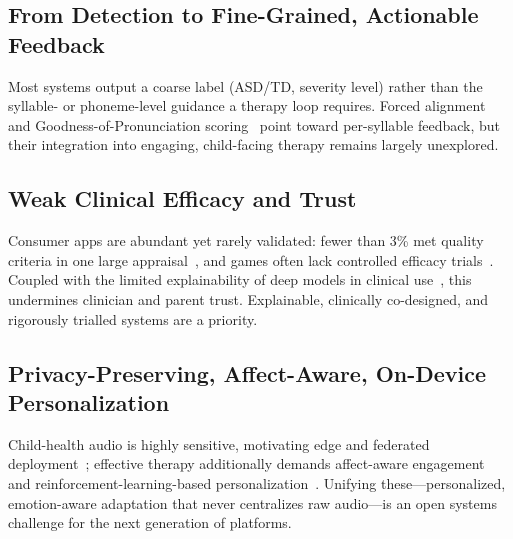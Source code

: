 \documentclass[conference]{IEEEtran}
\begin{document}
\subsection{From Detection to Fine-Grained, Actionable Feedback}
Most systems output a coarse label (ASD/TD, severity level) rather than the syllable- or phoneme-level guidance a therapy loop requires. Forced alignment and Goodness-of-Pronunciation scoring~\cite{ref22} point toward per-syllable feedback, but their integration into engaging, child-facing therapy remains largely unexplored.

\subsection{Weak Clinical Efficacy and Trust}
Consumer apps are abundant yet rarely validated: fewer than 3\% met quality criteria in one large appraisal~\cite{ref13}, and games often lack controlled efficacy trials~\cite{ref12}. Coupled with the limited explainability of deep models in clinical use~\cite{ref20}, this undermines clinician and parent trust. Explainable, clinically co-designed, and rigorously trialled systems are a priority.

\subsection{Privacy-Preserving, Affect-Aware, On-Device Personalization}
Child-health audio is highly sensitive, motivating edge and federated deployment~\cite{ref23,ref24}; effective therapy additionally demands affect-aware engagement~\cite{ref18,ref19} and reinforcement-learning-based personalization~\cite{ref11}. Unifying these---personalized, emotion-aware adaptation that never centralizes raw audio---is an open systems challenge for the next generation of platforms.

\end{document}
